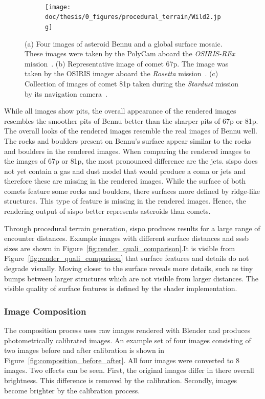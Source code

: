 \begin{figure}[htb]
\begin{subfigure}[b]{0.4\textwidth}
        \caption{}
        \label{fig:render_quali_67p}
    \end{subfigure}
    \\
    \begin{subfigure}[b]{0.6\textwidth}
        \centering
        \texttt{[image: doc/thesis/0\_figures/procedural\_terrain/Wild2.jpg]}
        \caption{}
        \label{fig:render_quali_81p}
    \end{subfigure}
    \label{fig:render_quali}
    \caption{(a) Four images of asteroid Bennu and a global surface mosaic. These images were taken by the PolyCam aboard the \textit{OSIRIS-REx} mission~\cite{NASAFourBennu}. (b) Representative image of comet \acrlong{67p}. The image was taken by the OSIRIS imager aboard the \textit{Rosetta} mission~\cite{OSIRISArchiveb}. (c) Collection of images of comet \acrlong{81p} taken during the \textit{Stardust} mission by its navigation camera~\cite{StardustImages}.}
\end{figure}

While all images show pits, the overall appearance of the rendered images resembles the smoother pits of Bennu better than the sharper pits of \gls{67p} or \gls{81p}. The overall looks of the rendered images resemble the real images of Bennu well. The rocks and boulders present on Bennu's surface appear similar to the rocks and boulders in the rendered images. When comparing the rendered images to the images of \gls{67p} or \gls{81p}, the most pronounced difference are the jets. \Gls{sispo} does not yet contain a gas and dust model that would produce a coma or jets and therefore these are missing in the rendered images. While the surface of both comets feature some rocks and boulders, there surfaces more defined by ridge-like structures. This type of feature is missing in the rendered images. Hence, the rendering output of \gls{sispo} better represents asteroids than comets.

Through procedural terrain generation, \gls{sispo} produces results for a large range of encounter distances. Example images with different surface distances and \gls{sssb} sizes are shown in Figure~\ref{fig:render_quali_comparison}.It is visible from Figure~\ref{fig:render_quali_comparison} that surface features and details do not degrade visually. Moving closer to the surface reveals more details, such as tiny bumps between larger structures which are not visible from larger distances. The visible quality of surface features is defined by the shader implementation. 

\subsubsection{Image Composition}
The composition process uses raw images rendered with Blender and produces photometrically calibrated images. An example set of four images consisting of two images before and after calibration is shown in Figure~\ref{fig:composition_before_after}. All four images were converted to \SI{8}{\bit} images. Two effects can be seen. First, the original images differ in there overall brightness. This difference is removed by the calibration. Secondly, images become brighter by the calibration process. 

